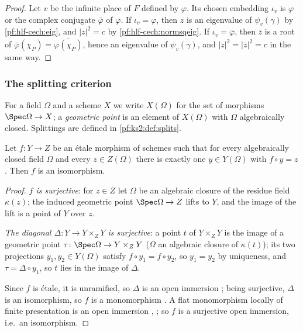 \begin{proof}
Let $v$ be the infinite place of $F$ defined by $\varphi$. Its chosen embedding $\iota_v$ is $\varphi$ or the complex conjugate
$\bar\varphi$ of $\varphi$. If $\iota_v=\varphi$, then $z$ is an eigenvalue of $\psi_v(\gamma)$ by \cref{pf:hlf-cech:eig}, and $|z|^2=c$ by
\cref{pf:hlf-cech:normsqeig}. If $\iota_v=\bar\varphi$, then $\bar z$ is a root of $\bar\varphi(\chi_P)=\overline{\varphi(\chi_P)}$, hence
an eigenvalue of $\psi_v(\gamma)$, and $|z|^2=|\bar z|^2=c$ in the same way.
\end{proof}

\subsubsection{The splitting criterion}

For a field $\Omega$ and a scheme $X$ we write $X(\Omega)$ for the set of morphisms $\Spec\Omega\to X$; a \emph{geometric point} is an
element of $X(\Omega)$ with $\Omega$ algebraically closed. Splittings are defined in \cref{pf:ks2:def:splits}.

\begin{lemma}\label{pf:hlf-cech:isopts}
Let $f\colon Y\to Z$ be an \'etale morphism of schemes such that for every algebraically closed field $\Omega$ and every
$z\in Z(\Omega)$ there is exactly one $y\in Y(\Omega)$ with $f\circ y=z$. Then $f$ is an isomorphism.
\end{lemma}

\begin{proof}
\emph{$f$ is surjective}: for $z\in Z$ let $\Omega$ be an algebraic closure of the residue field $\kappa(z)$; the induced geometric point
$\Spec\Omega\to Z$ lifts to $Y$, and the image of the lift is a point of $Y$ over $z$.

\emph{The diagonal $\Delta\colon Y\to Y\times_ZY$ is surjective}: a point $t$ of $Y\times_ZY$ is the image of a geometric point
$\tau\colon\Spec\Omega\to Y\times_ZY$ ($\Omega$ an algebraic closure of $\kappa(t)$); its two projections $y_1,y_2\in Y(\Omega)$ satisfy
$f\circ y_1=f\circ y_2$, so $y_1=y_2$ by uniqueness, and $\tau=\Delta\circ y_1$, so $t$ lies in the image of $\Delta$.

Since $f$ is \'etale, it is unramified, so $\Delta$ is an open immersion \cite[Tag~02GE]{Stacks2024}; being surjective, $\Delta$ is an
isomorphism, so $f$ is a monomorphism \cite[Tag~01L3]{Stacks2024}. A flat monomorphism locally of finite presentation is an open
immersion \cite[IV, Thm.~17.9.1]{Grothendieck1967}, \cite[Tag~025G]{Stacks2024}; so $f$ is a surjective open immersion, i.e.\ an
isomorphism.
\end{proof}

